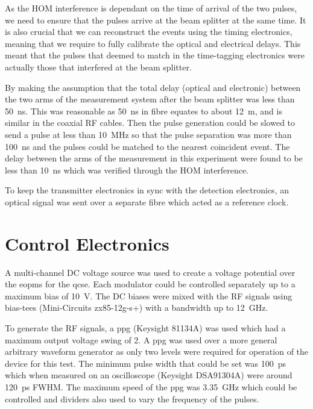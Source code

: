 As the \ac{HOM} interference is dependant on the time of arrival of the two pulses, we need to ensure that the pulses arrive at the beam splitter at the same time. It is also crucial that we can reconstruct the events using the timing electronics, meaning that we require to fully calibrate the optical and electrical delays. This meant that the pulses that deemed to match in the time-tagging electronics were actually those that interfered at the beam splitter. 

By making the assumption that the total delay (optical and electronic) between the two arms of the measurement system after the beam splitter was less than \SI{50}{\ns}. This was reasonable as \SI{50}{\ns} in fibre equates to about \SI{12}{\m}, and is similar in the coaxial RF cables. Then the pulse generation could be slowed to send a pulse at less than \SI{10}{\MHz} so that the pulse separation was more than \SI{100}{\ns} and the pulses could be matched to the nearest coincident event. The delay between the arms of the measurement in this experiment were found to be less than \SI{10}{\ns} which was verified through the \ac{HOM} interference.

To keep the transmitter electronics in sync with the detection electronics, an optical signal was sent over a separate fibre which acted as a reference clock. 

\section{Control Electronics}



A multi-channel DC voltage source was used to create a voltage potential over the \acp{eopm} for the \ac{qcse}. Each modulator could be controlled separately up to a maximum bias of \SI{10}{V}. The DC biases were mixed with the RF signals using bias-tees (Mini-Circuits zx85-12g-s+) with a bandwidth up to \SI{12}{GHz}. 

To generate the RF signals, a \ac{ppg} (Keysight 81134A) was used which had a maximum output voltage swing of \SI{2}{\Vpp}. A \ac{ppg} was used over a more general arbitrary waveform generator as only two levels were required for operation of the device for this test. The minimum pulse width that could be set was \SI{100}{\ps} which when measured on an oscilloscope (Keysight DSA91304A) were around \SI{120}{\ps} \ac{FWHM}. The maximum speed of the \ac{ppg} was \SI{3.35}{\GHz} which could be controlled and dividers also used to vary the frequency of the pulses. 


